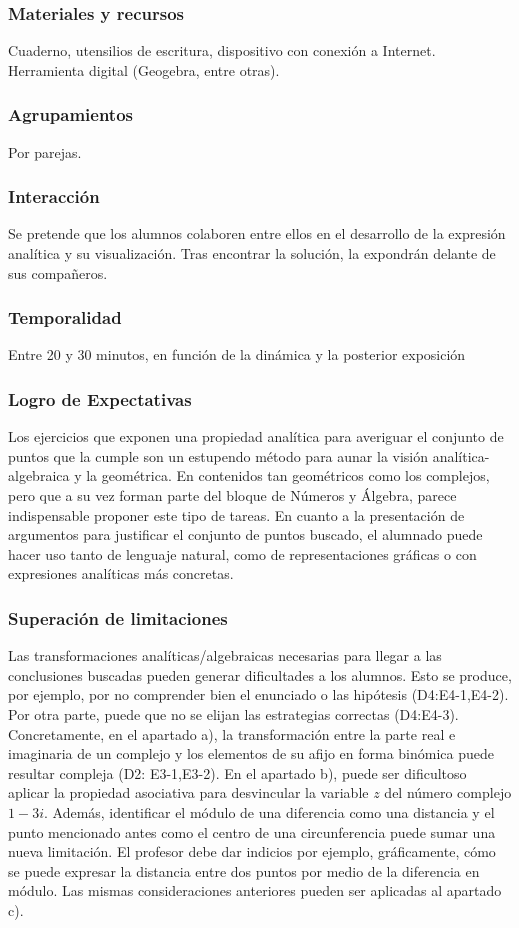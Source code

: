 \documentclass[../main.tex]{memoir}
\begin{document}
\subsubsection{Materiales y recursos}
Cuaderno, utensilios de escritura, dispositivo con conexión a Internet. Herramienta digital (Geogebra, entre otras).


\subsubsection{Agrupamientos}
Por parejas.


\subsubsection{Interacción}
Se pretende que los alumnos colaboren entre ellos en el desarrollo de la expresión analítica y su visualización. Tras encontrar la solución, la expondrán delante de sus compañeros.


\subsubsection{Temporalidad}
Entre 20 y 30 minutos, en función de la dinámica y la posterior exposición


\subsubsection{Logro de Expectativas}
Los ejercicios que exponen una propiedad analítica para averiguar el conjunto de puntos que la cumple son un estupendo método para aunar la visión analítica-algebraica y la geométrica. En contenidos tan geométricos como los complejos, pero que a su vez forman parte del bloque de Números y Álgebra, parece indispensable proponer este tipo de tareas. En cuanto a la presentación de argumentos para justificar el conjunto de puntos buscado, el alumnado puede hacer uso tanto de lenguaje natural, como de representaciones gráficas o con expresiones analíticas más concretas.


\subsubsection{Superación de limitaciones}
Las transformaciones analíticas/algebraicas necesarias para llegar a las conclusiones buscadas pueden generar dificultades a los alumnos. Esto se produce, por ejemplo, por no comprender bien el enunciado o las hipótesis (D4:E4-1,E4-2). Por otra parte, puede que no se elijan las estrategias correctas (D4:E4-3). Concretamente, en el apartado a), la transformación entre la parte real e imaginaria de un complejo y los elementos de su afijo en forma binómica puede resultar compleja (D2: E3-1,E3-2). En el apartado b), puede ser dificultoso aplicar la propiedad asociativa para desvincular la variable $z$ del número complejo $1-3i$. Además, identificar el módulo de una diferencia como una distancia y el punto mencionado antes como el centro de una circunferencia puede sumar una nueva limitación. El profesor debe dar indicios por ejemplo, gráficamente, cómo se puede expresar la distancia entre dos puntos por medio de la diferencia en módulo. Las mismas consideraciones anteriores pueden ser aplicadas al apartado c).
\end{document}
